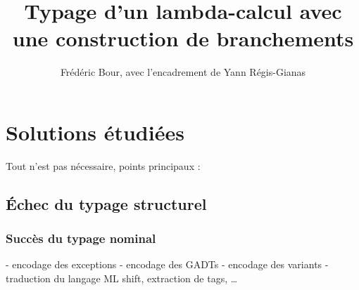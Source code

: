 \documentclass[12pt]{report}
\title{Typage d'un lambda-calcul avec une construction de branchements}
\author{Frédéric Bour, avec l'encadrement de Yann Régis-Gianas}
\begin{document}
\maketitle





\chapter{Solutions étudiées}

Tout n'est pas nécessaire, points principaux :

\section{Échec du typage structurel}

\subsection{Succès du typage nominal}

- encodage des exceptions
- encodage des GADTs
- encodage des variants
  - traduction du langage ML
    shift, extraction de tags, …






\end{document}

